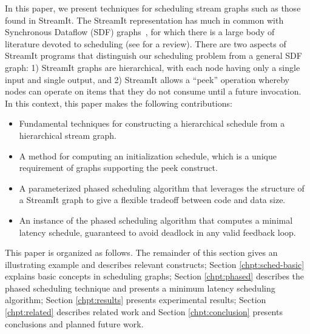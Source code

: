 In this paper, we present techniques for scheduling stream graphs such
as those found in StreamIt.  The StreamIt representation has much in
common with Synchronous Dataflow (SDF) graphs~\cite{lee87static}, for
which there is a large body of literature devoted to scheduling (see
\cite{bhattacharyya99synthesis} for a review).  There are two aspects
of StreamIt programs that distinguish our scheduling problem from a
general SDF graph: 1) StreamIt graphs are hierarchical, with each node
having only a single input and single output, and 2) StreamIt allows a
``peek'' operation whereby nodes can operate on items that they do not
consume until a future invocation.  In this context, this paper makes
the following contributions:
\begin{itemize}
\item Fundamental techniques for constructing a hierarchical schedule
from a hierarchical stream graph.

\item A method for computing an initialization schedule, which is a
unique requirement of graphs supporting the peek construct.

\item A parameterized phased scheduling algorithm that leverages the
structure of a StreamIt graph to give a flexible tradeoff between code
and data size.

\item An instance of the phased scheduling algorithm that computes a
minimal latency schedule, guaranteed to avoid deadlock in any valid
feedback loop.
\end{itemize}
This paper is organized as follows.  The remainder of this section
gives an illustrating example and describes relevant {\StreamIt}
constructs; Section \ref{chpt:sched-basic} explains basic concepts in
scheduling {\StreamIt} graphs; Section \ref{chpt:phased} describes the
phased scheduling technique and presents a minimum latency scheduling
algorithm; Section \ref{chpt:results} presents experimental results;
Section \ref{chpt:related} describes related work and Section
\ref{chpt:conclusion} presents conclusions and planned future work.

